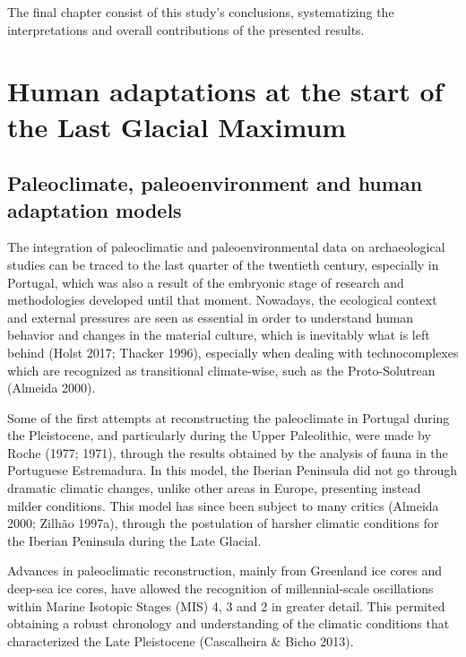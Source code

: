 \documentclass[12pt,twoside]{reedthesis}
\begin{document}
The final chapter consist of this study's conclusions, systematizing the interpretations and overall contributions of the presented results.

\hypertarget{human-adaptations-at-the-start-of-the-last-glacial-maximum}{%
\chapter{Human adaptations at the start of the Last Glacial Maximum}\label{human-adaptations-at-the-start-of-the-last-glacial-maximum}}

\hypertarget{paleoclimate-paleoenvironment-and-human-adaptation-models}{%
\section{Paleoclimate, paleoenvironment and human adaptation models}\label{paleoclimate-paleoenvironment-and-human-adaptation-models}}

The integration of paleoclimatic and paleoenvironmental data on archaeological studies can be traced to the last quarter of the twentieth century, especially in Portugal, which was also a result of the embryonic stage of research and methodologies developed until that moment. Nowadays, the ecological context and external pressures are seen as essential in order to understand human behavior and changes in the material culture, which is inevitably what is left behind (Holst 2017; Thacker 1996), especially when dealing with technocomplexes which are recognized as transitional climate-wise, such as the Proto-Solutrean (Almeida 2000).

Some of the first attempts at reconstructing the paleoclimate in Portugal during the Pleistocene, and particularly during the Upper Paleolithic, were made by Roche (1977; 1971), through the results obtained by the analysis of fauna in the Portuguese Estremadura. In this model, the Iberian Peninsula did not go through dramatic climatic changes, unlike other areas in Europe, presenting instead milder conditions. This model has since been subject to many critics (Almeida 2000; Zilhão 1997a), through the postulation of harsher climatic conditions for the Iberian Peninsula during the Late Glacial.

Advances in paleoclimatic reconstruction, mainly from Greenland ice cores and deep-sea ice cores, have allowed the recognition of millennial-scale oscillations within Marine Isotopic Stages (MIS) 4, 3 and 2 in greater detail. This permited obtaining a robust chronology and understanding of the climatic conditions that characterized the Late Pleistocene (Cascalheira \& Bicho 2013).
\end{document}

